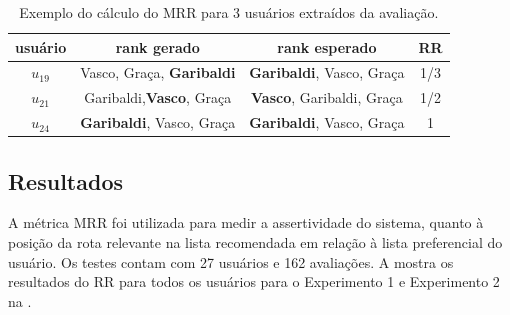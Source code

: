 \documentclass[portuguese]{textolivre}
\begin{document}
\begin{table}[h!]
\centering
\begin{threeparttable}

\caption{Exemplo do cálculo do MRR para 3 usuários extraídos da avaliação.}
    \label{tab:table7}
\begin{tabular}{ cccc } 
        \toprule 
            usuário & rank gerado & rank esperado & RR\\
         \midrule
         $u_{19}$  & Vasco, Graça, \textbf{Garibaldi} &  \textbf{Garibaldi}, Vasco, Graça & 1/3  \\

         $u_{21}$ & Garibaldi,\textbf{Vasco}, Graça & \textbf{Vasco}, Garibaldi, Graça & 1/2 \\
    
         $u_{24}$ & \textbf{Garibaldi}, Vasco, Graça & \textbf{Garibaldi}, Vasco, Graça & 1 \\
        \bottomrule
    \end{tabular}
\end{threeparttable}
\end{table}

\subsection{Resultados}

A métrica MRR foi utilizada para medir a assertividade do sistema, quanto à posição da rota relevante na lista recomendada em relação à lista preferencial do usuário. Os testes contam com 27 usuários e 162 avaliações. A  mostra os resultados do RR para todos os usuários para o Experimento 1  %
e Experimento 2 na .%
\end{document}
